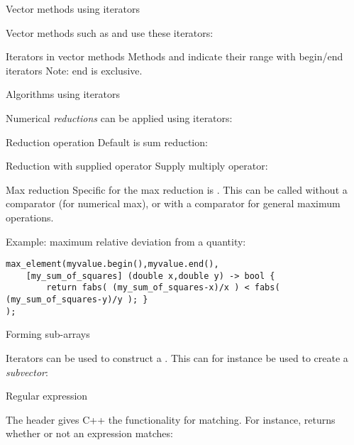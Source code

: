  {Vector methods using iterators}

Vector methods such as  and  use
these iterators:
\begin{block}{Iterators in vector methods}
  \label{sl:vec-erase}
  Methods  and  indicate their range with begin/end
  iterators
  Note: end is exclusive.
\end{block}

 {Algorithms using iterators}
\label{sec:alg-iter}

Numerical \emph{reductions} can be applied using iterators:
\begin{block}{Reduction operation}
  \label{sl:vec-accumulate}
  Default is sum reduction:
\end{block}

\begin{block}{Reduction with supplied operator}
  \label{sl:vec-multiplies}
  Supply multiply operator:
\end{block}

\begin{block}{Max reduction}
  Specific for the max reduction is .
  This can be called without a comparator (for numerical max),
  or with a comparator for general maximum operations.

  Example: maximum relative deviation from a quantity:
\begin{lstlisting}
max_element(myvalue.begin(),myvalue.end(),
    [my_sum_of_squares] (double x,double y) -> bool {
        return fabs( (my_sum_of_squares-x)/x ) < fabs( (my_sum_of_squares-y)/y ); }
);
\end{lstlisting}
\end{block}

 {Forming sub-arrays}

Iterators can be used to construct a . This can
for instance be used to create a
\emph{subvector}:
%

 {Regular expression}

The header  gives C++ the functionality for
 matching. For instance,
 returns whether or not an expression matches:

